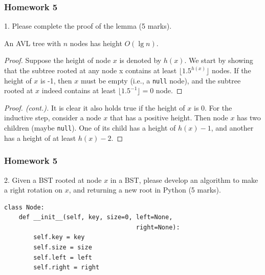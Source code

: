 \documentclass[aspectratio=169, 14pt]{beamer}
\begin{document}
\begin{frame}
    \frametitle{Homework 5}
1. Please complete the proof of the lemma (5 marks).
  \begin{lemma}
    An AVL tree with $n$ nodes has height $O(\lg{n})$. 
    \end{lemma} 
    \begin{proof}
    Suppose the height of node $x$ is denoted by $h(x)$. We start by showing that \alert{the subtree rooted at any node x contains at least $\lfloor 1.5^{h(x)} \rfloor$ nodes}. If the height of $x$ is -1, then $x$ must be empty (i.e., a \texttt{null} node), and the subtree rooted at $x$ indeed contains at least $\lfloor 1.5^{-1} \rfloor = 0$ node.
    \end{proof}
    \end{frame}
    
    \begin{frame}
        \begin{proof}[Proof. (cont.)]
            It is clear it also holds true if the height of $x$ is 0. For the inductive step, consider a node $x$ that has a positive height. Then node $x$ has two children (maybe \texttt{null}). One of its child has a height of $h(x)-1$, and another has a height of at least $h(x) - 2$. 
            
            \end{proof}
    \end{frame}

\begin{frame}[fragile]
    \frametitle{Homework 5}
2. Given a BST rooted at node $x$ in a BST, please develop an algorithm to make a right rotation on $x$, and returning a new root in Python (5 marks).

\begin{verbatim}
class Node:
    def __init__(self, key, size=0, left=None, 
                                    right=None):
        self.key = key
        self.size = size
        self.left = left
        self.right = right
\end{verbatim}
\end{frame}
\end{document}
